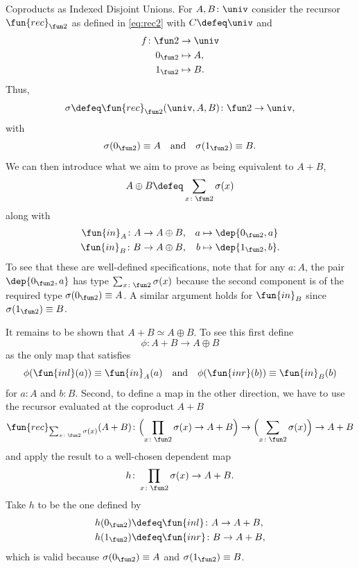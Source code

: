 \begin{lpar}{Coproducts as Indexed Disjoint Unions.}\label{lpar:coproduct-as-disjoint-union}
    For $A,B\colon\univ$ consider the recursor $\fun{rec}_{\fun2}$ as defined in \eqref{eq:rec2} with $C\defeq\univ$ and 
    \begin{align*}
        f\colon\fun2&\to\univ\\
        0_{\fun2}&\mapsto A,\\
        1_{\fun2}&\mapsto B.
    \end{align*}
    Thus,
    \[
        \sigma\defeq\fun{rec}_{\fun2}(\univ,A,B)\colon\fun2\to\univ,
    \]
    with
    \[
        \sigma(0_{\fun2})\equiv A
        \quad\text{and}\quad
        \sigma(1_{\fun2})\equiv B.
    \]
    We can then introduce what we aim to prove as being equivalent to $A+B$,
    \[
        A \oplus B \defeq \sum_{x\colon\fun2} \sigma(x)
    \]
    along with
    \begin{equation}\label{eq:inA-inB}
        \begin{aligned}
            \fun{in}_A\colon A&\to A\oplus B, &a&\mapsto\dep{0_{\fun2},a}\\
            \fun{in}_B\colon B&\to A\oplus B, &b&\mapsto\dep{1_{\fun2},b}.
        \end{aligned}
    \end{equation}
    To see that these are well-defined specifications, note that for any $a\colon A$, the pair $\dep{0_{\fun2},a}$ has type $\sum_{x\colon\fun2}\sigma(x)$ because the second component is of the required type $\sigma(0_{\fun2})\equiv A$. A similar argument holds for $\fun{in}_B$ since $\sigma(1_{\fun2}) \equiv B$.

    It remains to be shown that $A+B\simeq A\oplus B$. To see this first define
    \begin{equation}\label{eq:phi-coproduct-to-sigma}
        \phi\colon A+B\to A\oplus B
    \end{equation}
    as the only map that satisfies
    \[
        \phi(\fun{inl}(a))\equiv\fun{in}_A(a)
        \quad\text{and}\quad
        \phi(\fun{inr}(b))\equiv\fun{in}_B(b)
    \]
    for $a\colon A$ and $b\colon B$. Second, to define a map in the other direction, we have to use the recursor evaluated at the coproduct $A+B$
    \[
        \fun{rec}_{\sum_{x\colon\fun2} \sigma(x)}(A+B)\colon
            \Bigl(\prod_{x\colon\fun2}\sigma(x)
                \to A+B\Bigr)
                \to \Bigl(\sum_{x\colon\fun2}\sigma(x)\Bigr)
                \to A+B
    \]
    and apply the result to a well-chosen dependent map
    \[
        h\colon\prod_{x\colon\fun2}\sigma(x)\to A+B.
    \]
    Take $h$ to be the one defined by
    \begin{align*}
        h(0_{\fun2})&\defeq\fun{inl}\colon A\to A+B,\\
        h(1_{\fun2})&\defeq\fun{inr}\colon B\to A+B,
    \end{align*}
    which is valid because $\sigma(0_{\fun2})\equiv A$ and $\sigma(1_{\fun2})\equiv B$.


\end{lpar}

